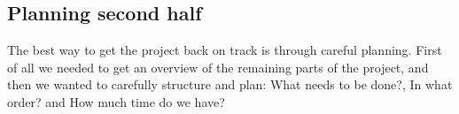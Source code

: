 \subsection{Planning second half}
The best way to get the project back on track is through careful planning. First of all we needed to get an overview of the remaining parts of the project, and then we wanted to carefully structure and plan: What needs to be done?, In what order? and How much time do we have?